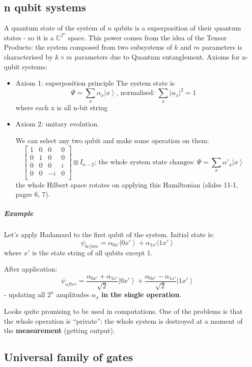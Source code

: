 \documentclass{scrartcl}
\newcommand{\cplx}{\mathbb{C}} %
\newcommand{\ket}[1]{\left| #1 \right>} %
\begin{document}
\subsection{n qubit systems}
\label{sec:nQubitSystems}
A quantum state of the system of $n$ qubits is a superposition of their quantum
states - so it is a $\cplx^{2^n}$ space. This power comes from the idea of the
Tensor Products: the system composed from two subsystems of $k$ and $m$
parameters is characterised by $k \times m$ parameters due to Quantum
entanglement. Axioms for n-qubit systems:
\begin{itemize}
\item Axiom 1: superposition principle The system state is $$\Psi = \sum_x
  \alpha_x \ket x \text{, normalised: } \sum_x |\alpha_x|^2 = 1$$ where each x
  is all n-bit string

\item Axiom 2: unitary evolution.

  We can select any two qubit and make some operation on them:
$$\left[ \begin{array}{cccc}
    1& 0& 0 & 0 \\
    0& 1& 0 & 0 \\
    0& 0& 0 & i \\
    0& 0& -i & 0 \\
  \end{array}\right] \otimes I_{n-2} \text{; the whole system state changes: } \Psi = \sum_x \alpha'_x \ket x  $$
the whole Hilbert space rotates on applying this Hamiltonian (slides 11-1, pages
6, 7).
\end{itemize}

\subparagraph{Example} Let's apply Hadamard to the first qubit of the system.
Initial state is: $$\psi_{before} = \alpha_{0x'} \ket{0x'} + \alpha_{1x'}
\ket{1x'}$$ where $x'$ is the state string of all qubits except 1.

After application:
$$\psi_{after} = \frac{\alpha_{0x'} + \alpha_{1x'}}{\sqrt2} \ket{0x'} +
\frac{\alpha_{0x'} - \alpha_{1x'}}{\sqrt2} \ket{1x'}$$ - updating all $2^n$
amplitudes $\alpha_x$ {\bf in the single operation}.

Looks quite promising to be used in computations. One of the problems is that
the whole operation is ``private'': the whole system is destroyed at a moment of
the {\bf measurement} (getting output).

\subsection{Universal family of gates}
\label{sec:FamilyOfGates}
\end{document}
